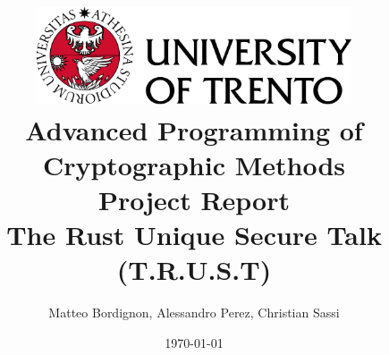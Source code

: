 \documentclass[12pt]{report}
\author{Matteo Bordignon, Alessandro Perez, Christian Sassi}
\title{
    \includegraphics[width=0.7\textwidth]{./imgs/marchio_unitrento_colore_en.png} \\
    \vspace{2 cm}
    \large Advanced Programming of Cryptographic Methods\\
    \vspace{1 cm}
    \small Project Report \\
    \vspace{1.5 cm}
    \huge \textbf{The Rust Unique Secure Talk (T.R.U.S.T)} \\ 
}
\date{\today}
\begin{document}
\begin{titlepage}
    \maketitle
\end{titlepage}

\tableofcontents
\newpage













\printbibliography
\end{document}
